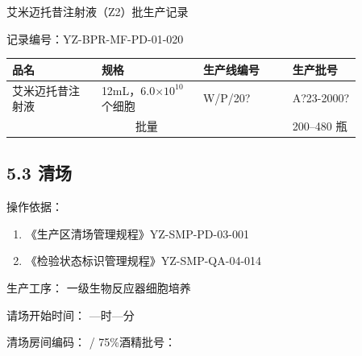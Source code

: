 \documentclass[UTF8,10pt,a4paper,fontset=fandol]{ctexart}
\newcommand{\fieldvalue}[1]{#1}
\newcommand{\handwritten}[1]{#1}
\begin{document}
\begin{center}
{\large 艾米迈托昔注射液（Z2）批生产记录}
\end{center}

\begin{flushright}
记录编号：YZ-BPR-MF-PD-01-020
\end{flushright}

\begin{center}
\begin{tabular}{|p{0.22\linewidth}|p{0.25\linewidth}|p{0.22\linewidth}|p{0.17\linewidth}|}
\hline
品名 & 规格 & 生产线编号 & 生产批号 \\
\hline
\fieldvalue{艾米迈托昔注射液}
&
\fieldvalue{12mL，6.0$\times 10^{10}$个细胞}
&
\fieldvalue{\handwritten{W/P/20?}}
&
\fieldvalue{\handwritten{A?23-2000?}}
\\
\hline
\multicolumn{3}{|c|}{批量}
&
\fieldvalue{200--480 瓶}
\\
\hline
\end{tabular}
\end{center}

\subsection*{5.3 清场}

操作依据：

\begin{enumerate}
\item 《生产区清场管理规程》\hfill YZ-SMP-PD-03-001
\item 《检验状态标识管理规程》\hfill YZ-SMP-QA-04-014
\end{enumerate}

生产工序：
\fieldvalue{一级生物反应器细胞培养}

请场开始时间：
\fieldvalue{\handwritten{—时—分}}

\par
清场房间编码：
\fieldvalue{\handwritten{/}}
\hfill
75\%酒精批号：\underline{\hspace{3cm}}
\end{document}
